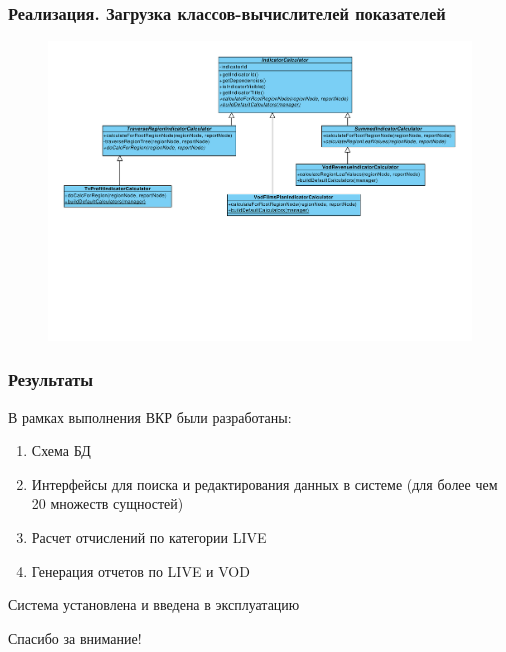 \documentclass{beamer}
\begin{document}
\begin{frame}[t]
\frametitle{Реализация. Загрузка классов-вычислителей показателей}
\begin{figure}
\begin{center}
\vspace{0cm}
\hspace*{-1cm} \includegraphics[scale=0.43]{../resources/uml/StatReportIndicatorCalculator.pdf}
\end{center}
\end{figure}
\end{frame}

\begin{frame}
\frametitle{Результаты}
В рамках выполнения ВКР были разработаны:
\begin{enumerate}
\item {
Схема БД
}
\item {
Интерфейсы для поиска и редактирования данных в системе (для более чем 20 множеств сущностей)
}
\item {
Расчет отчислений по категории LIVE
}
\item {
Генерация отчетов по LIVE и VOD
}
\end{enumerate}


Система установлена и введена в эксплуатацию

\end{frame}


\begin{frame}
{\Large Спасибо за внимание!}
\end{frame}
\end{document}
